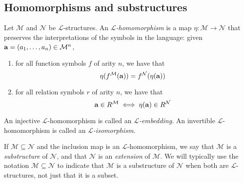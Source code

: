 \subsection{Homomorphisms and substructures}
\begin{definition}
    Let \( \mathcal M \) and \( \mathcal N \) be \( \mathcal L \)-structures.
    An \emph{\( \mathcal L \)-homomorphism} is a map \( \eta : \mathcal M \to \mathcal N \) that preserves the interpretations of the symbols in the language: given \( \vb a = (a_1, \dots, a_n) \in \mathcal M^n \),
    \begin{enumerate}
        \item for all function symbols \( f \) of arity \( n \), we have that
        \[ \eta(f^{\mathcal M}(\vb a)) = f^{\mathcal N}(\eta(\vb a)) \]
        \item for all relation symbols \( r \) of arity \( n \), we have that
        \[ \vb a \in R^{\mathcal M} \iff \eta(\vb a) \in R^{\mathcal N} \]
    \end{enumerate}
    An injective \( \mathcal L \)-homomorphism is called an \emph{\( \mathcal L \)-embedding}.
    An invertible \( \mathcal L \)-homomorphism is called an \emph{\( \mathcal L \)-isomorphism}.
\end{definition}
\begin{definition}
    If \( \mathcal M \subseteq \mathcal N \) and the inclusion map is an \( \mathcal L \)-homomorphism, we say that \( \mathcal M \) is a \emph{substructure} of \( \mathcal N \), and that \( \mathcal N \) is an \emph{extension} of \( \mathcal M \).
    We will typically use the notation \( \mathcal M \subseteq \mathcal N \) to indicate that \( \mathcal M \) is a substructure of \( \mathcal N \) when both are \( \mathcal L \)-structures, not just that it is a subset.
\end{definition}
